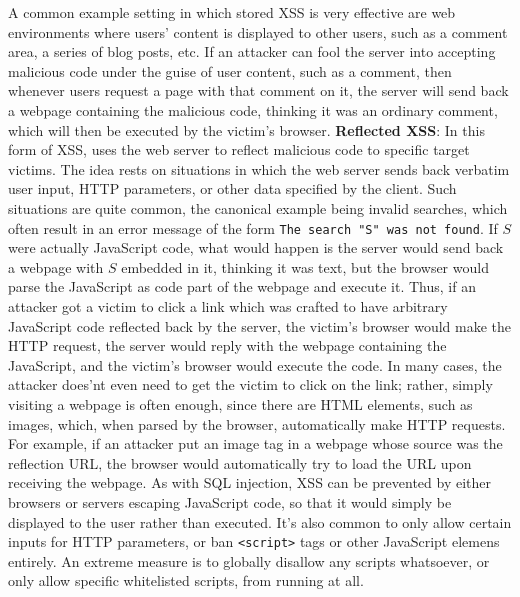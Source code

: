 \documentclass{article}
\begin{document}
\indent A common example setting in which stored XSS is very effective are web environments where users' content is displayed to other users, such as a comment area, a series of blog posts, etc. If an attacker can fool the server into accepting malicious code under the guise of user content, such as a comment, then whenever users request a page with that comment on it, the server will send back a webpage containing the malicious code, thinking it was an ordinary comment, which will then be executed by the victim's browser.
\newline \newline
\textbf{Reflected XSS}: In this form of XSS, uses the web server to reflect malicious code to specific target victims. The idea rests on situations in which the web server sends back verbatim user input, HTTP parameters, or other data specified by the client. Such situations are quite common, the canonical example being invalid searches, which often result in an error message of the form \texttt{The search "S" was not found}. If $ S $ were actually JavaScript code, what would happen is the server would send back a webpage with $ S $ embedded in it, thinking it was text, but the browser would parse the JavaScript as code part of the webpage and execute it.
\newline
\indent Thus, if an attacker got a victim to click a link which was crafted to have arbitrary JavaScript code reflected back by the server, the victim's browser would make the HTTP request, the server would reply with the webpage containing the JavaScript, and the victim's browser would execute the code. In many cases, the attacker does'nt even need to get the victim to click on the link; rather, simply visiting a webpage is often enough, since there are HTML elements, such as images, which, when parsed by the browser, automatically make HTTP requests. For example, if an attacker put an image tag in a webpage whose source was the reflection URL, the browser would automatically try to load the URL upon receiving the webpage.
\newline \newline
As with SQL injection, XSS can be prevented by either browsers or servers escaping JavaScript code, so that it would simply be displayed to the user rather than executed. It's also common to only allow certain inputs for HTTP parameters, or ban \texttt{<script>} tags or other JavaScript elemens entirely. An extreme measure is to globally disallow any scripts whatsoever, or only allow specific whitelisted scripts, from running at all.
\end{document}
